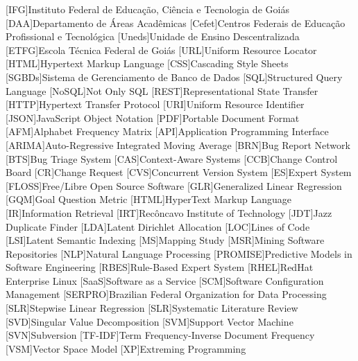 \begin{acronym}[ACRONYM] 
[IFG]{Instituto Federal de Educação, Ciência e Tecnologia de Goiás}
[DAA]{Departamento de Áreas Acadêmicas}
[Cefet]{Centros Federais de Educação Profissional e Tecnológica}
[Uneds]{Unidade de Ensino Descentralizada}
[ETFG]{Escola Técnica Federal de Goiás}
[URL]{Uniform Resource Locator}
[HTML]{Hypertext Markup Language}
[CSS]{Cascading Style Sheets}
[SGBDs]{Sistema de Gerenciamento de Banco de Dados}
[SQL]{Structured Query Language}
[NoSQL]{Not Only SQL}
[REST]{Representational State Transfer}
[HTTP]{Hypertext Transfer Protocol}
[URI]{Uniform Resource Identifier}
[JSON]{JavaScript Object Notation}
[PDF]{Portable Document Format}
[AFM]{Alphabet Frequency Matrix}
[API]{Application Programming Interface}
[ARIMA]{Auto-Regressive Integrated Moving Average}
[BRN]{Bug Report Network}
[BTS]{Bug Triage System}
[CAS]{Context-Aware Systems}
[CCB]{Change Control Board}
[CR]{Change Request}
[CVS]{Concurrent Version System}
[ES]{Expert System}
[FLOSS]{Free/Libre Open Source Software}
[GLR]{Generalized Linear Regression}
[GQM]{Goal Question Metric}
[HTML]{HyperText Markup Language}
[IR]{Information Retrieval}
[IRT]{Recôncavo Institute of Technology}
[JDT]{Jazz Duplicate Finder}
[LDA]{Latent Dirichlet Allocation}
[LOC]{Lines of Code}
[LSI]{Latent Semantic Indexing}
[MS]{Mapping Study}
[MSR]{Mining Software Repositories}
[NLP]{Natural Language Processing}
[PROMISE]{Predictive Models in Software Engineering}
[RBES]{Rule-Based Expert System}
[RHEL]{RedHat Enterprise Linux}
[SaaS]{Software as a Service}
[SCM]{Software Configuration Management}
[SERPRO]{Brazilian Federal Organization for Data Processing}
[SLR]{Stepwise Linear Regression}
[SLR]{Systematic Literature Review}
[SVD]{Singular Value Decomposition}
[SVM]{Support Vector Machine}
[SVN]{Subversion}
[TF-IDF]{Term Frequency-Inverse Document Frequency}
[VSM]{Vector Space Model}
[XP]{Extreming Programming}
\end{acronym}